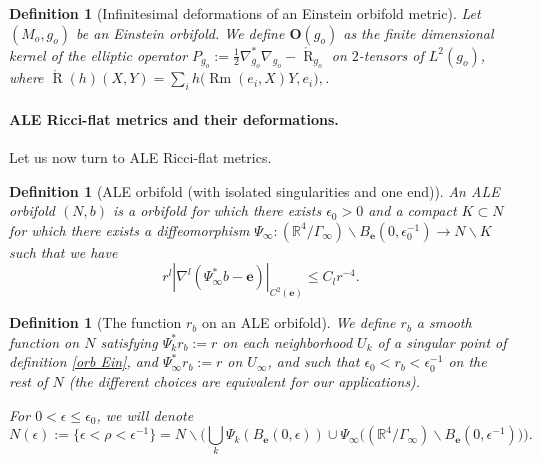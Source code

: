\documentclass[12pt]{article}
\newtheorem{defn}[thm]{Definition}
\DeclareMathOperator{\Rm}{\operatorname{Rm}}
\DeclareMathOperator{\R}{\operatorname{R}}
\begin{document}
\begin{defn}[Infinitesimal deformations of an Einstein orbifold metric]
    Let $(M_o,g_o)$ be an Einstein orbifold. We define $\mathbf{O}(g_o)$ as the finite dimensional kernel of the elliptic operator $P_{g_o}:= \frac{1}{2}\nabla^*_{g_o}\nabla_{g_o}- \mathring{\R}_{g_o}$ on $2$-tensors of $L^2(g_o)$, where  $\mathring{\R}(h)(X,Y)= \sum_i h\big(\Rm(e_i,X)Y,e_i\big),$.
\end{defn}

\paragraph{ALE Ricci-flat metrics and their deformations.}

Let us now turn to ALE Ricci-flat metrics.

\begin{defn}[ALE orbifold (with isolated singularities and one end)]\label{def orb ale}
    An ALE orbifold $(N,b)$ is a orbifold for which there exists $\epsilon_0>0$ and a compact $K\subset N$ for which there exists a diffeomorphism $\Psi_\infty: (\mathbb{R}^4\slash\Gamma_\infty)\backslash B_\mathbf{e}(0,\epsilon_0^{-1}) \to N\backslash K$ such that we have $$r^l|\nabla^l(\Psi_\infty^* b - \mathbf{e})|_{C^2(\mathbf{e})}\leqslant C_l r^{-4}.$$
\end{defn}


\begin{defn}[The function $r_{b}$ on an ALE orbifold]
We define $r_{b}$ a smooth function on $N$ satisfying $\Psi_k^*r_{b}:=  r$ on each neighborhood $U_k$ of a singular point of definition \ref{orb Ein}, and $ \Psi_\infty^* r_{b}:=r$ on $U_\infty$, and such that $\epsilon_0<r_{b}<\epsilon_0^{-1}$ on the rest of $N$ (the different choices are equivalent for our applications).

For $0<\epsilon\leqslant\epsilon_0$, we will denote $$N(\epsilon):= \{\epsilon<\rho<\epsilon^{-1}\} = N\backslash  \Big(\bigcup_k \Psi_k(B_\mathbf{e}(0,\epsilon)) \cup \Psi_\infty \big((\mathbb{R}^4\slash\Gamma_\infty)\backslash B_\mathbf{e}(0,\epsilon^{-1})\big)\Big).$$
\end{defn}
\end{document}
